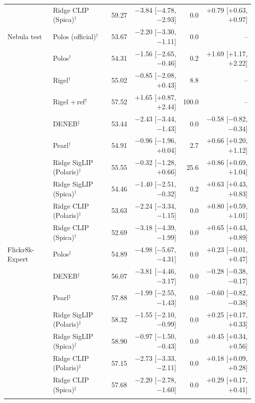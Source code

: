\begin{tabular}{llrrrr}
 & Ridge CLIP (Spica)$^{\dagger}$ & 59.27 & $-$3.84 [$-$4.78, $-$2.93] & 0.0 & $+$0.79 [$+$0.63, $+$0.97] \\
\addlinespace
Nebula test & Polos (official)$^{\dagger}$ & 53.67 & $-$2.20 [$-$3.30, $-$1.11] & 0.0 & -- \\
 & Polos$^{\dagger}$ & 54.31 & $-$1.56 [$-$2.65, $-$0.46] & 0.2 & $+$1.69 [$+$1.17, $+$2.22] \\
 & Rigel$^{\dagger}$ & 55.02 & $-$0.85 [$-$2.08, $+$0.43] & 8.8 & -- \\
 & Rigel +\,ref$^{\dagger}$ & 57.52 & $+$1.65 [$+$0.87, $+$2.44] & 100.0 & -- \\
 & DENEB$^{\ddagger}$ & 53.44 & $-$2.43 [$-$3.44, $-$1.43] & 0.0 & $-$0.58 [$-$0.82, $-$0.34] \\
 & Pearl$^{\dagger}$ & 54.91 & $-$0.96 [$-$1.96, $+$0.04] & 2.7 & $+$0.66 [$+$0.20, $+$1.12] \\
 & Ridge SigLIP (Polaris)$^{\dagger}$ & 55.55 & $-$0.32 [$-$1.28, $+$0.66] & 25.6 & $+$0.86 [$+$0.69, $+$1.04] \\
 & Ridge SigLIP (Spica)$^{\dagger}$ & 54.46 & $-$1.40 [$-$2.51, $-$0.32] & 0.2 & $+$0.63 [$+$0.43, $+$0.83] \\
 & Ridge CLIP (Polaris)$^{\dagger}$ & 53.63 & $-$2.24 [$-$3.34, $-$1.15] & 0.0 & $+$0.80 [$+$0.59, $+$1.01] \\
 & Ridge CLIP (Spica)$^{\dagger}$ & 52.69 & $-$3.18 [$-$4.39, $-$1.99] & 0.0 & $+$0.65 [$+$0.43, $+$0.89] \\
\addlinespace
Flickr8k-Expert & Polos$^{\ddagger}$ & 54.89 & $-$4.98 [$-$5.67, $-$4.31] & 0.0 & $+$0.23 [$-$0.01, $+$0.47] \\
 & DENEB$^{\ddagger}$ & 56.07 & $-$3.81 [$-$4.46, $-$3.17] & 0.0 & $-$0.28 [$-$0.38, $-$0.17] \\
 & Pearl$^{\ddagger}$ & 57.88 & $-$1.99 [$-$2.55, $-$1.43] & 0.0 & $-$0.60 [$-$0.82, $-$0.38] \\
 & Ridge SigLIP (Polaris)$^{\ddagger}$ & 58.32 & $-$1.55 [$-$2.10, $-$0.99] & 0.0 & $+$0.25 [$+$0.17, $+$0.33] \\
 & Ridge SigLIP (Spica)$^{\ddagger}$ & 58.90 & $-$0.97 [$-$1.50, $-$0.43] & 0.0 & $+$0.45 [$+$0.34, $+$0.56] \\
 & Ridge CLIP (Polaris)$^{\ddagger}$ & 57.15 & $-$2.73 [$-$3.33, $-$2.11] & 0.0 & $+$0.18 [$+$0.09, $+$0.28] \\
 & Ridge CLIP (Spica)$^{\ddagger}$ & 57.68 & $-$2.20 [$-$2.78, $-$1.60] & 0.0 & $+$0.29 [$+$0.17, $+$0.41] \\
\addlinespace

\end{tabular}
